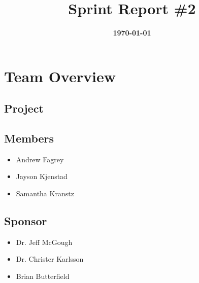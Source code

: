\documentclass{article}
\title{\normalfont\Large\bfseries\color{TitleColor}Sprint Report \#2}
\date{\normalfont\bfseries\color{TitleColor}\today}
\begin{document}
\maketitle

\section*{Team Overview}
\subsection*{Project}

\subsection*{Members}
\begin{itemize}
	\item Andrew Fagrey
	\item Jayson Kjenstad
	\item Samantha Kranstz
\end{itemize}

\subsection*{Sponsor}
\begin{itemize}
	\item Dr. Jeff McGough
	\item Dr. Christer Karlsson
	\item Brian Butterfield
\end{itemize}
\end{document}
